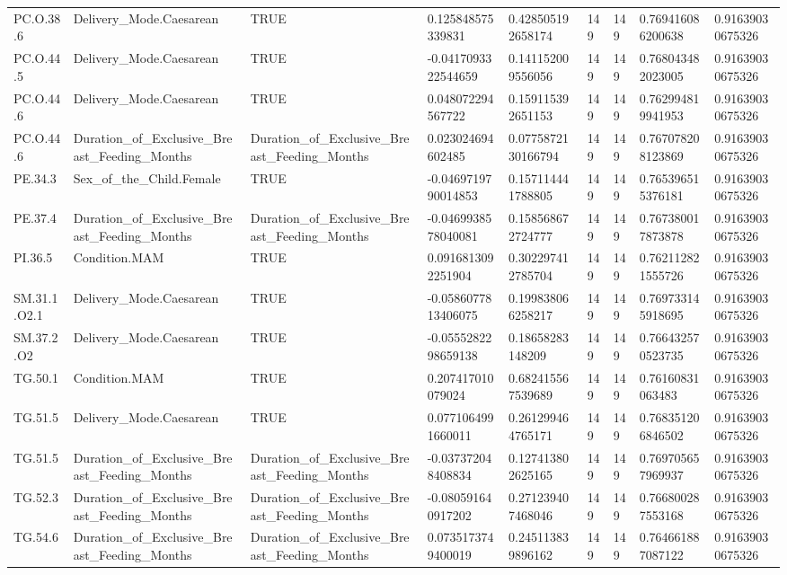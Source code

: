 \begin{longtable}{lllllllll}
PC.O.38.6 & Delivery\_Mode.Caesarean & TRUE & 0.125848575339831 & 0.428505192658174 & 149 & 149 & 0.769416086200638 & 0.91639030675326 \\
PC.O.44.5 & Delivery\_Mode.Caesarean & TRUE & -0.0417093322544659 & 0.141152009556056 & 149 & 149 & 0.768043482023005 & 0.91639030675326 \\
PC.O.44.6 & Delivery\_Mode.Caesarean & TRUE & 0.048072294567722 & 0.159115392651153 & 149 & 149 & 0.762994819941953 & 0.91639030675326 \\
PC.O.44.6 & Duration\_of\_Exclusive\_Breast\_Feeding\_Months & Duration\_of\_Exclusive\_Breast\_Feeding\_Months & 0.023024694602485 & 0.0775872130166794 & 149 & 149 & 0.767078208123869 & 0.91639030675326 \\
PE.34.3 & Sex\_of\_the\_Child.Female & TRUE & -0.0469719790014853 & 0.157114441788805 & 149 & 149 & 0.765396515376181 & 0.91639030675326 \\
PE.37.4 & Duration\_of\_Exclusive\_Breast\_Feeding\_Months & Duration\_of\_Exclusive\_Breast\_Feeding\_Months & -0.0469938578040081 & 0.158568672724777 & 149 & 149 & 0.767380017873878 & 0.91639030675326 \\
PI.36.5 & Condition.MAM & TRUE & 0.0916813092251904 & 0.302297412785704 & 149 & 149 & 0.762112821555726 & 0.91639030675326 \\
SM.31.1.O2.1 & Delivery\_Mode.Caesarean & TRUE & -0.0586077813406075 & 0.199838066258217 & 149 & 149 & 0.769733145918695 & 0.91639030675326 \\
SM.37.2.O2 & Delivery\_Mode.Caesarean & TRUE & -0.0555282298659138 & 0.18658283148209 & 149 & 149 & 0.766432570523735 & 0.91639030675326 \\
TG.50.1 & Condition.MAM & TRUE & 0.207417010079024 & 0.682415567539689 & 149 & 149 & 0.76160831063483 & 0.91639030675326 \\
TG.51.5 & Delivery\_Mode.Caesarean & TRUE & 0.0771064991660011 & 0.261299464765171 & 149 & 149 & 0.768351206846502 & 0.91639030675326 \\
TG.51.5 & Duration\_of\_Exclusive\_Breast\_Feeding\_Months & Duration\_of\_Exclusive\_Breast\_Feeding\_Months & -0.037372048408834 & 0.127413802625165 & 149 & 149 & 0.769705657969937 & 0.91639030675326 \\
TG.52.3 & Duration\_of\_Exclusive\_Breast\_Feeding\_Months & Duration\_of\_Exclusive\_Breast\_Feeding\_Months & -0.080591640917202 & 0.271239407468046 & 149 & 149 & 0.766800287553168 & 0.91639030675326 \\
TG.54.6 & Duration\_of\_Exclusive\_Breast\_Feeding\_Months & Duration\_of\_Exclusive\_Breast\_Feeding\_Months & 0.0735173749400019 & 0.245113839896162 & 149 & 149 & 0.764661887087122 & 0.91639030675326 \\

\end{longtable}
